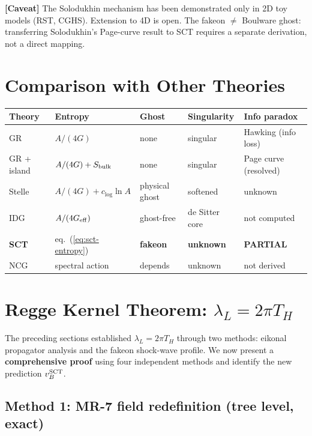 \documentclass[11pt,a4paper]{article}
\theoremstyle{plain}
\theoremstyle{definition}
\newcommand{\caveat}[1]{%
  \par\smallskip\noindent
  \colorbox{yellow!15}{\parbox{\dimexpr\linewidth-2\fboxsep}{%
    \textcolor{orange!70!black}{\textbf{[Caveat]}} #1}}%
  \par\smallskip}
\begin{document}
\caveat{The Solodukhin mechanism has been demonstrated only in 2D
  toy models (RST, CGHS).  Extension to 4D is open.
  The fakeon $\neq$ Boulware ghost: transferring Solodukhin's
  Page-curve result to SCT requires a separate derivation,
  not a direct mapping.}


\section{Comparison with Other Theories}
\label{sec:comparison}

\begin{longtable}{p{2.4cm}p{3.2cm}p{2.5cm}p{2.5cm}p{2.5cm}}
\toprule
\textbf{Theory} & \textbf{Entropy} & \textbf{Ghost} & \textbf{Singularity} & \textbf{Info paradox} \\
\midrule
GR & $A/(4G)$ & none & singular & Hawking (info loss) \\
GR + island & $A/(4G) + S_{\rm bulk}$ & none & singular & Page curve (resolved) \\
Stelle & $A/(4G) + c_{\log}\ln A$ & physical ghost & softened & unknown \\
IDG & $A/(4G_{\rm eff})$ & ghost-free & de Sitter core & not computed \\
\textbf{SCT} & eq.~(\ref{eq:sct-entropy}) & \textbf{fakeon} & \textbf{unknown} & \textbf{PARTIAL} \\
NCG & spectral action & depends & unknown & not derived \\
\bottomrule
\end{longtable}


\section{Regge Kernel Theorem: $\lambda_L = 2\pi T_H$}
\label{sec:regge}

The preceding sections established $\lambda_L = 2\pi T_H$ through
two methods: eikonal propagator analysis and the fakeon shock-wave
profile.  We now present a \textbf{comprehensive proof} using four
independent methods and identify the new prediction $v_B^{\rm SCT}$.

\subsection{Method 1: MR-7 field redefinition (tree level, exact)}
\end{document}

